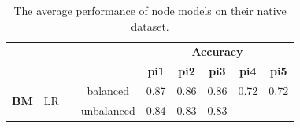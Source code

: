 \documentclass{mpaper}
\begin{document}
\begin{table}[]
\begin{tabular}{|cccc|ccccc|}
                                                        &                                                          &                                                           &                                              & \multicolumn{5}{c|}{\textbf{Accuracy}}                                                            \\ \cline{5-9} 
                                                        &                                                          &                                                           &                                              & \textbf{pi1}                         & \textbf{pi2}  & \textbf{pi3} & \textbf{pi4} & \textbf{pi5} \\ \hline
\multicolumn{1}{|c|}{\multirow{2}{*}{\textbf{BM}}}      & \multicolumn{1}{c|}{\multirow{2}{*}{LR}}                 & \multicolumn{1}{c|}{}                                     & balanced                                     & 0.87                                 & 0.86          & 0.86         & 0.72         & 0.72         \\ \cline{4-9} 
\multicolumn{1}{|c|}{}                                  & \multicolumn{1}{c|}{}                                    & \multicolumn{1}{c|}{}                                     & unbalanced                                   & 0.84                                 & 0.83          & 0.83         & -            & -            \\ \hline
\end{tabular}
\caption{\label{tab:node_performance}The average performance of node models on their native dataset.}
\end{table}
\end{document}
